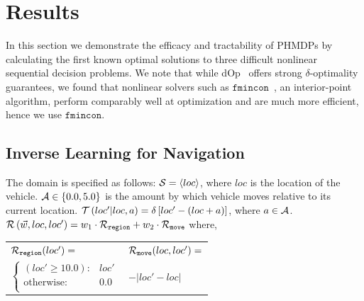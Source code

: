 \section{Results}
\label{sec:results}

In this section we demonstrate the efficacy and tractability of PHMDPs by calculating the first known optimal solutions to three difficult nonlinear sequential decision problems. We note that while dOp~\cite{Gao2013} offers strong {\footnotesize $ \delta $}-optimality guarantees, we found that nonlinear solvers such as $ \mathtt{fmincon} $~\cite{MATLAB_2010}, an interior-point algorithm, perform comparably well at optimization and are much more efficient, hence we use $ \mathtt{fmincon} $.

\subsection{Inverse Learning for Navigation}
\label{sec:results_navigation}

The domain is specified as follows: {\footnotesize $ \mathcal{S} = \left\langle loc \right\rangle$}, where $ loc $ is the location of the vehicle. {\footnotesize $ \mathcal{A} \in \left\lbrace 0.0, 5.0 \right\rbrace $} is the amount by which vehicle moves relative to its current location. {\footnotesize $ \mathcal{T}\left( loc' | loc, a \right) = \delta \left[ loc' - (loc + a) \right] $}, where {\footnotesize $ a \in \mathcal{A} $}. {\footnotesize $ \mathcal{R}\left(\vec{w}, loc, loc'\right) = w_1 \cdot \mathcal{R}_{\mathtt{region}} + w_2 \cdot \mathcal{R}_{\mathtt{move}} $} where,

{\footnotesize 
    \abovedisplayskip=10pt
    \belowdisplayskip=0pt
    \renewcommand{\arraystretch}{1.5}
    \begin{tabular}{ll}    
        $ \mathcal{R}_{\mathtt{region}}(loc') = $ &  $ \mathcal{R}_{\mathtt{move}}(loc, loc') =  $ \\
        \qquad $ \begin{cases}
        (loc' \geq 10.0 ) : 				& loc' \\
        \text{otherwise} : 					& 0.0 \\
        \end{cases} $ 						& \qquad $ - \lvert loc' - loc \rvert  $\\
    \end{tabular}
} 

